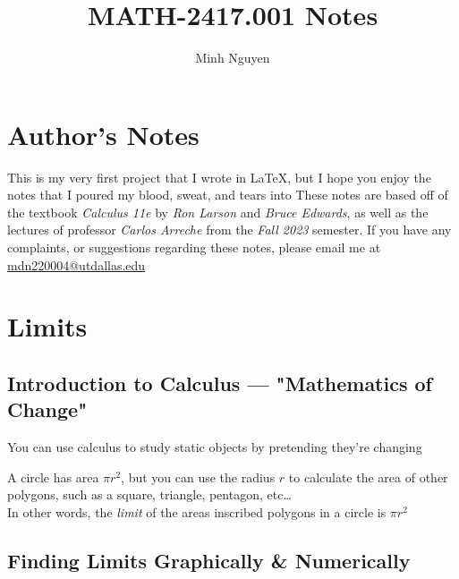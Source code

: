\documentclass{MathNotes}
\title{MATH-2417.001 Notes}
\author{Minh Nguyen}
\begin{document}
\newpage
\maketitle
{}
\tableofcontents
\newpage
\section*{Author's Notes}
This is my very first project that I wrote in \LaTeX, but I hope you enjoy
the notes that I poured my blood, sweat, and tears into  
\br
These notes are based off of the textbook \textit{Calculus 11e} by 
\textit{Ron Larson} and \textit{Bruce Edwards}, as well as the lectures of 
professor \textit{Carlos Arreche} from the \textit{Fall 2023} semester.
\br
If you have any complaints, or suggestions regarding these notes, please
email me at \href{mailto:minh.nguyen7@utdallas.edu}{mdn220004@utdallas.edu}
\newpage
{}

\section{Limits}\label{sec:1}
\subsection{Introduction to Calculus --- "Mathematics of Change"}

You can use calculus to study static objects by pretending they're changing
\\

\begin{example}{}
    A circle has area $\pi r^2$, but you can use the radius $r$ to calculate
    the area of other polygons, such as a square, triangle, pentagon, etc\dots
    \\

    In other words, the \textit{limit} of the areas inscribed polygons in a circle
    is $\pi r^2$
\end{example}

\subsection{Finding Limits Graphically \& Numerically}
\end{document}
